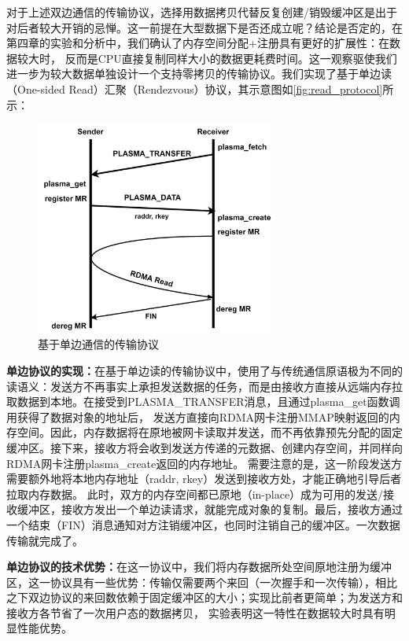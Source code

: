 对于上述双边通信的传输协议，选择用数据拷贝代替反复创建/销毁缓冲区是出于对后者较大开销的忌惮。这一前提在大型数据下是否还成立呢？结论是否定的，在第四章的实验和分析中，我们确认了内存空间分配+注册具有更好的扩展性：在数据较大时，
反而是CPU直接复制同样大小的数据更耗费时间。这一观察驱使我们进一步为较大数据单独设计一个支持零拷贝的传输协议。我们实现了基于单边读（One-sided Read）汇聚（Rendezvous）协议，其示意图如\autoref{fig:read_protocol}所示：

\begin{figure}[h]
	\centering
	\includegraphics[width=0.7\textwidth]{image/chap03/read_protocol.png}
	\caption{基于单边通信的传输协议}
	\label{fig:read_protocol}
\end{figure}

\textbf{单边协议的实现：}在基于单边读的传输协议中，使用了与传统通信原语极为不同的读语义：发送方不再事实上承担发送数据的任务，而是由接收方直接从远端内存拉取数据到本地。在接受到PLASMA\_TRANSFER消息，且通过plasma\_get函数调用获得了数据对象的地址后，
发送方直接向RDMA网卡注册MMAP映射返回的内存空间。因此，内存数据将在原地被网卡读取并发送，而不再依靠预先分配的固定缓冲区。接下来，接收方将会收到发送方传递的元数据、创建内存空间，并同样向RDMA网卡注册plasma\_create返回的内存地址。
需要注意的是，这一阶段发送方需要额外地将本地内存地址（raddr, rkey）发送到接收方处，才能正确地引导后者拉取内存数据。
此时，双方的内存空间都已原地（in-place）成为可用的发送/接收缓冲区，接收方发出一个单边读请求，就能完成对象的复制。最后，接收方通过一个结束（FIN）消息通知对方注销缓冲区，也同时注销自己的缓冲区。一次数据传输就完成了。

\textbf{单边协议的技术优势：}在这一协议中，我们将内存数据所处空间原地注册为缓冲区，这一协议具有一些优势：传输仅需要两个来回（一次握手和一次传输），相比之下双边协议的来回数依赖于固定缓冲区的大小；实现比前者更简单；为发送方和接收方各节省了一次用户态的数据拷贝，
实验表明这一特性在数据较大时具有明显性能优势。


